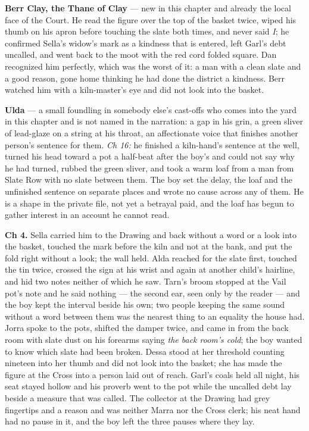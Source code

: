 \documentclass{design/chronicle}
\begin{document}
{\textbf{Berr Clay, the Thane of Clay} — new in this chapter and already the local face of the Court. He read the figure over the top of the basket twice, wiped his thumb on his apron before touching the slate both times, and never said \emph{I}; he confirmed Sella’s widow’s mark as a kindness that is entered, left Garl’s debt uncalled, and went back to the moot with the red cord folded square. Dan recognized him perfectly, which was the worst of it: a man with a clean slate and a good reason, gone home thinking he had done the district a kindness. Berr watched him with a kiln-master’s eye and did not look into the basket.

\textbf{Ulda} — a small foundling in somebody else’s cast-offs who comes into the yard in this chapter and is not named in the narration: a gap in his grin, a green sliver of lead-glaze on a string at his throat, an affectionate voice that finishes another person’s sentence for them. \emph{Ch 16:} he finished a kiln-hand’s sentence at the well, turned his head toward a pot a half-beat after the boy’s and could not say why he had turned, rubbed the green sliver, and took a warm loaf from a man from Slate Row with no slate between them. The boy set the delay, the loaf and the unfinished sentence on separate places and wrote no cause across any of them. He is a shape in the private file, not yet a betrayal paid, and the loaf has begun to gather interest in an account he cannot read.

\textbf{Ch 4.} Sella carried him to the Drawing and back without a word or a look into the basket, touched the mark before the kiln and not at the bank, and put the fold right without a look; the wall held. Alda reached for the slate first, touched the tin twice, crossed the sign at his wrist and again at another child’s hairline, and hid two notes neither of which he saw. Tarn’s broom stopped at the Vail pot’s note and he said nothing --- the second ear, seen only by the reader --- and the boy kept the interval beside his own; two people keeping the same sound without a word between them was the nearest thing to an equality the house had. Jorra spoke to the pots, shifted the damper twice, and came in from the back room with slate dust on his forearms saying \emph{the back room’s cold}; the boy wanted to know which slate had been broken. Dessa stood at her threshold counting nineteen into her thumb and did not look into the basket; she has made the figure at the Cross into a person laid out of reach. Garl’s coals held all night, his seat stayed hollow and his proverb went to the pot while the uncalled debt lay beside a measure that was called. The collector at the Drawing had grey fingertips and a reason and was neither Marra nor the Cross clerk; his neat hand had no pause in it, and the boy left the three pauses where they lay.

}
\end{document}
